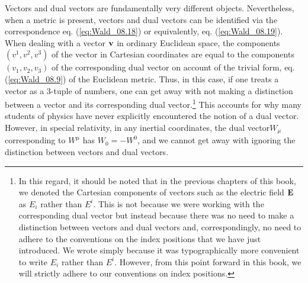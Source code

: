 Vectors and dual vectors are fundamentally very different objects. Nevertheless, when a metric is present, vectors and dual vectors can be identified via the correspondence eq. (\ref{eq:Wald_08.18}) or equivalently, eq. (\ref{eq:Wald_08.19}). When dealing with a vector 
$\vb{v}$ in ordinary Euclidean space, the components $(v^1, v^2, v^3)$ of the vector in Cartesian coordinates are equal to the components  $(v_1, v_2, v_3)$ of the corresponding dual vector on account of the trivial form, eq. (\ref{eq:Wald_08.9}) of the Euclidean metric. Thus, in this case, if one treats a vector as a 3-tuple of numbers, one can get away with not making a distinction between a vector and its corresponding dual vector.\footnote{In this regard, it should be noted that in the previous chapters of this book, we denoted the Cartesian components of vectors such as the electric field $\vb{E}$ as $E_i$ rather than $E^i$. This is not because we were working with the corresponding dual vector but instead because there was no need to make a distinction between vectors and dual vectors and, correspondingly, no need to adhere to the conventions on the index positions that we have just introduced. We wrote  simply because it was typographically more convenient to write $E_i$ rather than $E^i$. However, from this point forward in this book, we will strictly adhere to our conventions on index positions.} This accounts for why many students of physics have never explicitly encountered the notion of a dual vector. However, in special relativity, in any inertial coordinates, the dual vector$W_\mu$ corresponding to $W^\mu$ has $W_0 = - W^0$, and we cannot get away with ignoring the distinction between vectors and dual vectors.

